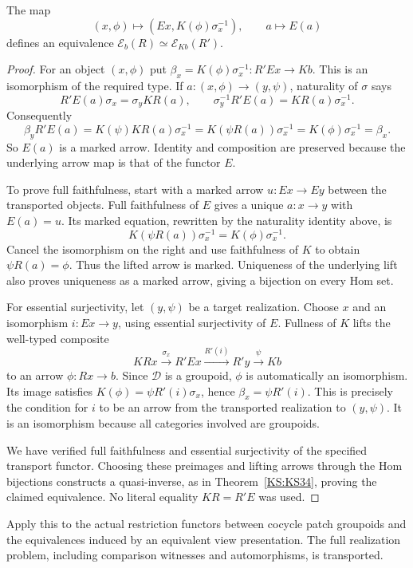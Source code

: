 \begin{KStheorem}\label{KS:KS39}
The map
\[
 (x,\phi)\longmapsto(Ex,K(\phi)\sigma_x^{-1}),\qquad a\longmapsto E(a)
\]
defines an equivalence \(\mathcal E_b(R)\simeq\mathcal E_{Kb}(R')\).
\end{KStheorem}
\begin{proof}
For an object $(x,\phi)$ put $\beta_x=K(\phi)\sigma_x^{-1}:R'Ex\to Kb$. This is an isomorphism of the required type. If $a:(x,\phi)\to(y,\psi)$, naturality of $\sigma$ says
\[
 R'E(a)\sigma_x=\sigma_yKR(a),
 \qquad \sigma_y^{-1}R'E(a)=KR(a)\sigma_x^{-1}.
\]
Consequently
\[
 \beta_yR'E(a)
 =K(\psi)KR(a)\sigma_x^{-1}
 =K(\psi R(a))\sigma_x^{-1}
 =K(\phi)\sigma_x^{-1}=\beta_x.
\]
So $E(a)$ is a marked arrow. Identity and composition are preserved because the underlying arrow map is that of the functor $E$.

To prove full faithfulness, start with a marked arrow $u:Ex\to Ey$ between the transported objects. Full faithfulness of $E$ gives a unique $a:x\to y$ with $E(a)=u$. Its marked equation, rewritten by the naturality identity above, is
\[
 K(\psi R(a))\sigma_x^{-1}=K(\phi)\sigma_x^{-1}.
\]
Cancel the isomorphism on the right and use faithfulness of $K$ to obtain $\psi R(a)=\phi$. Thus the lifted arrow is marked. Uniqueness of the underlying lift also proves uniqueness as a marked arrow, giving a bijection on every Hom set.

For essential surjectivity, let $(y,\psi)$ be a target realization. Choose $x$ and an isomorphism $i:Ex\to y$, using essential surjectivity of $E$. Fullness of $K$ lifts the well-typed composite
\[
 KRx\xrightarrow{\sigma_x}R'Ex
 \xrightarrow{R'(i)}R'y\xrightarrow{\psi}Kb
\]
to an arrow $\phi:Rx\to b$. Since $\mathcal D$ is a groupoid, $\phi$ is automatically an isomorphism. Its image satisfies $K(\phi)=\psi R'(i)\sigma_x$, hence $\beta_x=\psi R'(i)$. This is precisely the condition for $i$ to be an arrow from the transported realization to $(y,\psi)$. It is an isomorphism because all categories involved are groupoids.

We have verified full faithfulness and essential surjectivity of the specified transport functor. Choosing these preimages and lifting arrows through the Hom bijections constructs a quasi-inverse, as in Theorem~\ref{KS:KS34}, proving the claimed equivalence. No literal equality $KR=R'E$ was used.
\end{proof}
Apply this to the actual restriction functors between cocycle patch groupoids and the equivalences induced by an equivalent view presentation. The full realization problem, including comparison witnesses and automorphisms, is transported.

